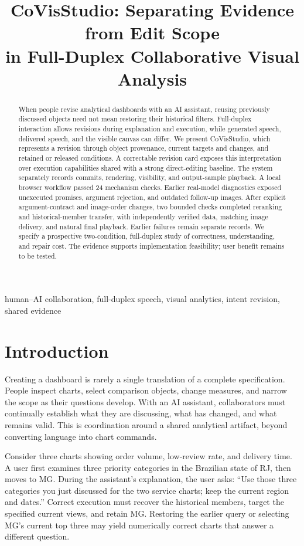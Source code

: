 \documentclass[conference,10pt,letterpaper]{IEEEtran}
\title{CoVisStudio: Separating Evidence from Edit Scope\\in Full-Duplex Collaborative Visual Analysis}
\author{\IEEEauthorblockN{Anonymous review draft}}
\begin{document}
\maketitle
\begin{abstract}
When people revise analytical dashboards with an AI assistant, reusing previously discussed objects need not mean restoring their historical filters. Full-duplex interaction allows revisions during explanation and execution, while generated speech, delivered speech, and the visible canvas can differ. We present CoVisStudio, which represents a revision through object provenance, current targets and changes, and retained or released conditions. A correctable revision card exposes this interpretation over execution capabilities shared with a strong direct-editing baseline. The system separately records commits, rendering, visibility, and output-sample playback. A local browser workflow passed 24 mechanism checks. Earlier real-model diagnostics exposed unexecuted promises, argument rejection, and outdated follow-up images. After explicit argument-contract and image-order changes, two bounded checks completed reranking and historical-member transfer, with independently verified data, matching image delivery, and natural final playback. Earlier failures remain separate records. We specify a prospective two-condition, full-duplex study of correctness, understanding, and repair cost. The evidence supports implementation feasibility; user benefit remains to be tested.
\end{abstract}
\begin{IEEEkeywords}
human--AI collaboration, full-duplex speech, visual analytics, intent revision, shared evidence
\end{IEEEkeywords}

\section{Introduction}
Creating a dashboard is rarely a single translation of a complete specification. People inspect charts, select comparison objects, change measures, and narrow the scope as their questions develop. With an AI assistant, collaborators must continually establish what they are discussing, what has changed, and what remains valid. This is coordination around a shared analytical artifact, beyond converting language into chart commands.

Consider three charts showing order volume, low-review rate, and delivery time. A user first examines three priority categories in the Brazilian state of RJ, then moves to MG. During the assistant's explanation, the user asks: ``Use those three categories you just discussed for the two service charts; keep the current region and dates.'' Correct execution must recover the historical members, target the specified current views, and retain MG. Restoring the earlier query or selecting MG's current top three may yield numerically correct charts that answer a different question.
\end{document}
